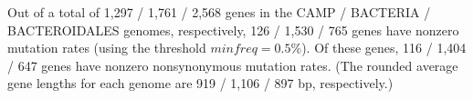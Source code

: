 Out of a total of 1,297 / 1,761 / 2,568 genes in the CAMP / BACTERIA / BACTEROIDALES genomes, respectively, 126 / 1,530 / 765 genes have nonzero mutation rates (using the threshold $minfreq=0.5\%$). Of these genes, 116 / 1,404 / 647 genes have nonzero nonsynonymous mutation rates. (The rounded average gene lengths for each genome are 919 / 1,106 / 897 bp, respectively.)\endinput
